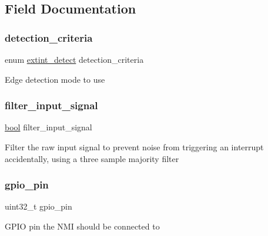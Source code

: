\subsection{Field Documentation}
\mbox{\label{structextint__chan__conf_a275ebcf2d5de2b96132c05744345a34c}} 
\subsubsection{\texorpdfstring{detection\_criteria}{detection\_criteria}}
{\footnotesize\ttfamily enum \mbox{\hyperlink{group__asfdoc__sam0__extint__group_ga920ab9931e047b548d07ad29dedfcca2}{extint\+\_\+detect}} detection\+\_\+criteria}

Edge detection mode to use \mbox{\label{structextint__chan__conf_a1a59d546b8bc80f31e5350a490c5b718}} 
\subsubsection{\texorpdfstring{filter\_input\_signal}{filter\_input\_signal}}
{\footnotesize\ttfamily \mbox{\hyperlink{group__group__sam0__utils_ga97a80ca1602ebf2303258971a2c938e2}{bool}} filter\+\_\+input\+\_\+signal}

Filter the raw input signal to prevent noise from triggering an interrupt accidentally, using a three sample majority filter \mbox{\label{structextint__chan__conf_aaa3ba20871e508028b08eed10d08db84}} 
\subsubsection{\texorpdfstring{gpio\_pin}{gpio\_pin}}
{\footnotesize\ttfamily uint32\+\_\+t gpio\+\_\+pin}

G\+P\+IO pin the N\+MI should be connected to \mbox{\label{structextint__chan__conf_ab223c84d8e5b59e9fcc8673c338a7a87}} 
